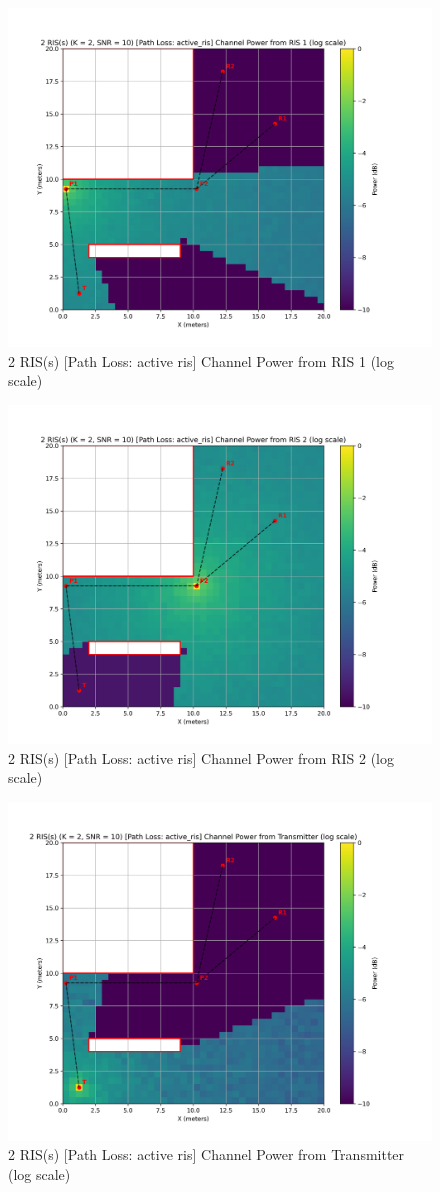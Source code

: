 \begin{figure}[H]
  \centering
  \includegraphics[width=0.7\linewidth]{imgs/heatmap-simulations/2 RIS(s) (K = 2, SNR = 10) [Path Loss_ active_ris] Channel Power from RIS 1 (log scale).png}
  \caption{2 RIS(s) [Path Loss: active ris] Channel Power from RIS 1 (log scale)}
\end{figure}

\begin{figure}[H]
  \centering
  \includegraphics[width=0.7\linewidth]{imgs/heatmap-simulations/2 RIS(s) (K = 2, SNR = 10) [Path Loss_ active_ris] Channel Power from RIS 2 (log scale).png}
  \caption{2 RIS(s) [Path Loss: active ris] Channel Power from RIS 2 (log scale)}
\end{figure}

\begin{figure}[H]
  \centering
  \includegraphics[width=0.7\linewidth]{imgs/heatmap-simulations/2 RIS(s) (K = 2, SNR = 10) [Path Loss_ active_ris] Channel Power from Transmitter (log scale).png}
  \caption{2 RIS(s) [Path Loss: active ris] Channel Power from Transmitter (log scale)}
\end{figure}

